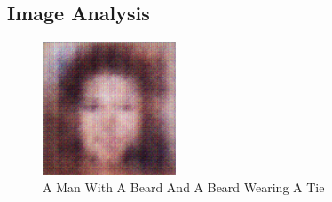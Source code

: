 \documentclass{article}%
\begin{document}
%
\subsection{Image Analysis}%
\label{subsec:ImageAnalysis}%


\begin{figure}[h!]%
\centering%
\includegraphics[width=150px]{500_fake_images/samples_5_214.png}%
\caption{A Man With A Beard And A Beard Wearing A Tie}%
\end{figure}

%
\end{document}
